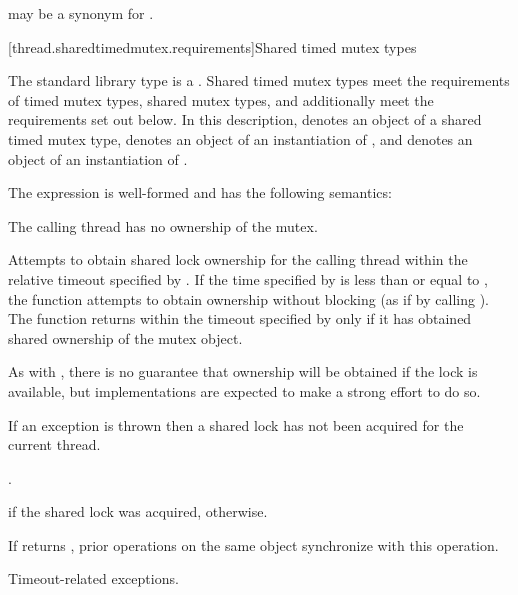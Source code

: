 \pnum
{} may be a synonym for .

[thread.sharedtimedmutex.requirements]{Shared timed mutex types}

\pnum
The standard library type  is a
. Shared timed mutex types meet the requirements of
timed mutex types,
shared mutex types, and additionally
meet the requirements set out below. In this description,
 denotes an object of a shared timed mutex type,
 denotes an object of an instantiation of
, and
 denotes an object of an instantiation of
.

\pnum
The expression  is well-formed and
has the following semantics:

\begin{itemdescr}
\pnum
\expects
The calling thread has no ownership of the mutex.

\pnum
\effects
Attempts to obtain
shared lock ownership for the calling thread within the relative
timeout specified by . If the time
specified by  is less than or equal to ,
the function attempts to obtain ownership without blocking (as if by calling
). The function returns within the timeout
specified by  only if it has obtained shared ownership of the
mutex object.
\begin{note}
As with , there is no guarantee that
ownership will be obtained if the lock is available, but implementations are
expected to make a strong effort to do so.
\end{note}
If an exception is thrown then a shared lock has not been acquired for
the current thread.

\pnum
\returntype {}.

\pnum
\returns
{} if the shared lock was acquired,  otherwise.

\pnum
\sync
If  returns , prior
 operations on the same object synchronize
with this operation.

\pnum
\throws
Timeout-related exceptions.
\end{itemdescr}

